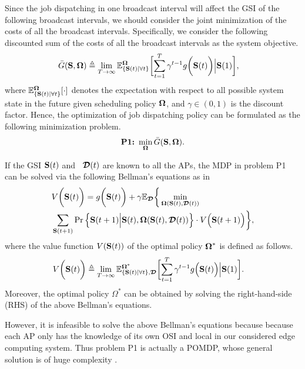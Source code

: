 Since the job dispatching in one broadcast interval will affect the GSI of the following broadcast intervals, we should consider the joint minimization of the costs of all the broadcast intervals.
Specifically, we consider the following discounted sum of the costs of all the broadcast intervals as the system objective.
{\small
\begin{align}
    &\bar{G}(\Stat, \Policy) \define
    \lim_{T \to \infty} \mathbb{E}^{\Policy}_{\set{\Stat(t)|\forall t}}
    \Bracket{
        \sum_{t=1}^{T} \gamma^{t-1} g\Paren{\Stat(t)} \Big| \Stat(1)
    },
\end{align}
}%
where $\mathbb{E}^{\boldsymbol{\Omega}}_{\{\mathbf{S}(t)|\forall t\}}[\cdot]$ denotes the expectation with respect to all possible system state in the future given scheduling policy $\boldsymbol{\Omega}$, and $\gamma \in (0,1)$ is the discount factor.
Hence, the optimization of job dispatching policy can be formulated as the following minimization problem.
{\small
\begin{align}
    \textbf{P1:}~
    \min_{\boldsymbol{\Omega}} \bar{G}(\mathbf{S}, \boldsymbol{\Omega}).
\end{align}
}%

If the GSI $\mathbf{S}(t)$ and \brlatency~$\boldsymbol{\mathcal{D}}(t)$ are known to all the APs, the MDP in problem P1 can be solved via the following Bellman's equations as in \cite{sutton1998}
{\small
\begin{align}
    &V\bigg(\mathbf{S}(t)\bigg) =g\bigg(\mathbf{S}(t)\bigg)
        + \gamma\mathbb{E}_{\boldsymbol{\mathcal{D}}}\bigg\{
            \min_{\boldsymbol{\Omega}(\mathbf{S}(t),\boldsymbol{\mathcal{D}}(t))}
            \nonumber\\
            &\sum_{\mathbf{S}(t+1)} \Pr \Big\{ 
                \mathbf{S}(t+1) \Big| \mathbf{S}(t), \boldsymbol{\Omega}(\mathbf{S}(t), \boldsymbol{\mathcal{D}}(t)) \Big\} \cdot V\Big(\mathbf{S}(t+1)\Big)
            \bigg\},
    \label{eqn:sp_0}
\end{align}
}%
where the value function $V(\mathbf{S}(t))$ of the optimal policy $\boldsymbol{\Omega}^{*}$ 
is defined as follows.
{\small
\begin{align}
    &V\Paren{\Stat(t)} \define
    \lim_{T\to\infty} 
    \mathbb{E}^{\Policy^*}_{\set{\Stat(t)|\forall t}, \Delay} \Bracket{
        \sum_{t=1}^{T} \gamma^{t-1} g\Big( \Stat(t) \Big) \Big| \Stat(1)
    }.
    \label{eqn:val_f}
\end{align}
}%
Moreover, the optimal policy $\Omega^{*}$ can be obtained by solving the right-hand-side (RHS) of the above Bellman's equations.

However, it is infeasible to solve the above Bellman's equations because because each AP only has the knowledge of its own OSI and local \brlatency in our considered edge computing system.
Thus problem P1 is actually a POMDP, whose general solution is of huge complexity \cite{IJCAI03-NairR,IJCAI99-BoutilierC}.
